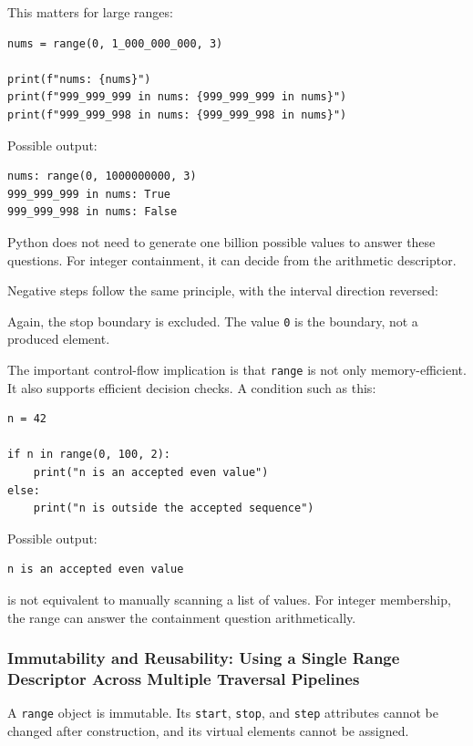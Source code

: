 This matters for large ranges:

\begin{verbatim}
nums = range(0, 1_000_000_000, 3)

print(f"nums: {nums}")
print(f"999_999_999 in nums: {999_999_999 in nums}")
print(f"999_999_998 in nums: {999_999_998 in nums}")
\end{verbatim}

Possible output:

\begin{verbatim}
nums: range(0, 1000000000, 3)
999_999_999 in nums: True
999_999_998 in nums: False
\end{verbatim}

Python does not need to generate one billion possible values to answer these questions. For integer containment, it can decide from the arithmetic descriptor.

Negative steps follow the same principle, with the interval direction reversed:

Again, the stop boundary is excluded. The value \texttt{0} is the boundary, not a produced element.

The important control-flow implication is that \texttt{range} is not only memory-efficient. It also supports efficient decision checks. A condition such as this:

\begin{verbatim}
n = 42

if n in range(0, 100, 2):
    print("n is an accepted even value")
else:
    print("n is outside the accepted sequence")
\end{verbatim}

Possible output:

\begin{verbatim}
n is an accepted even value
\end{verbatim}

is not equivalent to manually scanning a list of values. For integer membership, the range can answer the containment question arithmetically.

\subsubsection{Immutability and Reusability: Using a Single Range Descriptor Across Multiple Traversal Pipelines}

A \texttt{range} object is immutable. Its \texttt{start}, \texttt{stop}, and \texttt{step} attributes cannot be changed after construction, and its virtual elements cannot be assigned.

